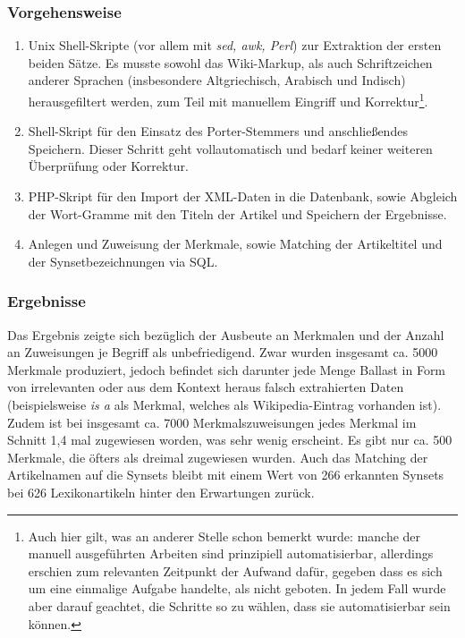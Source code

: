 \documentclass[pagesize,paper=A4,DIV=calc,fontsize=12pt,draft=false]{scrreprt}
\begin{document}
\subsubsection{Vorgehensweise}

\begin{enumerate}
\item Unix Shell-Skripte (vor allem mit \emph{sed, awk, Perl}) zur Extraktion der ersten beiden Sätze. 
    Es musste sowohl das Wiki-Markup, als auch Schriftzeichen anderer Sprachen (insbesondere Altgriechisch, Arabisch und Indisch) herausgefiltert werden, zum Teil mit manuellem Eingriff und Korrektur\footnote{Auch hier gilt, was an anderer Stelle schon bemerkt wurde: manche der manuell ausgeführten Arbeiten sind prinzipiell automatisierbar, allerdings erschien zum relevanten Zeitpunkt der Aufwand dafür, gegeben dass es sich um eine einmalige Aufgabe handelte, als nicht geboten. 
In jedem Fall wurde aber darauf geachtet, die Schritte so zu wählen, dass sie automatisierbar sein können.}.

\item Shell-Skript für den Einsatz des Porter-Stemmers und anschließendes Speichern. 
Dieser Schritt geht vollautomatisch und bedarf keiner weiteren Überprüfung oder Korrektur.

\item PHP-Skript für den Import der XML-Daten in die Datenbank, sowie Abgleich der Wort-Gramme mit den Titeln der Artikel und Speichern der Ergebnisse.

\item Anlegen und Zuweisung der Merkmale, sowie Matching der Artikeltitel und der Synsetbezeichnungen via SQL. 
\end{enumerate}

\subsubsection{Ergebnisse}

Das Ergebnis zeigte sich bezüglich der Ausbeute an Merkmalen und der Anzahl an Zuweisungen je Begriff als unbefriedigend. 
Zwar wurden insgesamt ca. 5000 Merkmale produziert, jedoch befindet sich darunter jede Menge Ballast in Form von irrelevanten oder aus dem Kontext heraus falsch extrahierten Daten (beispielsweise \emph{is a} als Merkmal, welches als Wikipedia-Eintrag vorhanden ist). 
Zudem ist bei insgesamt ca. 7000 Merkmalszuweisungen jedes Merkmal im Schnitt 1,4 mal zugewiesen worden, was sehr wenig erscheint. 
Es gibt nur ca. 500 Merkmale, die öfters als dreimal zugewiesen wurden. 
Auch das Matching der Artikelnamen auf die Synsets bleibt mit einem Wert von 266 erkannten Synsets bei 626 Lexikonartikeln hinter den Erwartungen zurück. 
\end{document}
